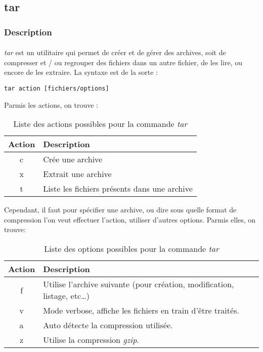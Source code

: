 \subsection*{tar}
\subsubsection*{Description}

\paragraph{}

\emph{tar} est un utilitaire qui permet de créer et de gérer des archives, soit
de compresser et / ou regrouper des fichiers dans un autre fichier, de les
lire, ou encore de les extraire. La syntaxe est de la sorte :

\begin{lstlisting}
tar action [fichiers/options]
\end{lstlisting}

Parmis les actions, on trouve :

\begin{table}[h]
	\centering
	\begin{tabular}{|c|p{10cm}|}
		\hline
		\textbf{Action} & \textbf{Description}\\
		\hline
		c               & Crée une archive\\
		\hline
		x               & Extrait une archive\\
		\hline
		t               & Liste les fichiers présents dans une archive\\
		\hline
	\end{tabular}
	\caption{Liste des actions possibles pour la commande \emph{tar}}
	\label{tab:taractions}
\end{table}

Cependant, il faut pour spécifier une archive, ou dire sous quelle format de
compression l'on veut effectuer l'action, utiliser d'autres options. Parmis
elles, on trouve:

\begin{table}[h]
	\centering
	\begin{tabular}{|c|p{10cm}|}
		\hline
		\textbf{Action} & \textbf{Description}\\
		\hline
		f & Utilise l'archive suivante (pour création, modification, listage,
			etc\ldots)\\
		\hline
		v & Mode verbose, affiche les fichiers en train d'être traités.\\
		\hline
		a & Auto détecte la compression utilisée.\\
		\hline
		z & Utilise la compression \emph{gzip}.\\
		\hline
	\end{tabular}
	\caption{Liste des options possibles pour la commande \emph{tar}}
	\label{tab:taroptions}
\end{table}

